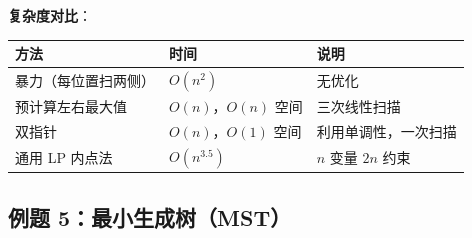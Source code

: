 \documentclass[12pt, a4paper]{ctexart}
\begin{document}
\begin{blackboard}
\textbf{复杂度对比}：

\begin{center}
\begin{tabular}{lll}
\toprule
方法 & 时间 & 说明 \\
\midrule
暴力（每位置扫两侧） & $O(n^2)$ & 无优化 \\
预计算左右最大值 & $O(n)$，$O(n)$ 空间 & 三次线性扫描 \\
双指针 & $O(n)$，$O(1)$ 空间 & 利用单调性，一次扫描 \\
通用 LP 内点法 & $O(n^{3.5})$ & $n$ 变量 $2n$ 约束 \\
\bottomrule
\end{tabular}
\end{center}

\end{blackboard}

\subsection{例题 5：最小生成树（MST）}
\end{document}
